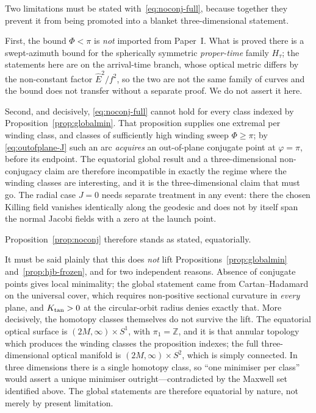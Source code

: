 \documentclass[12pt]{iopart}
\theoremstyle{plain}
\theoremstyle{definition}
\theoremstyle{remark}
\newcommand{\Ehat}{\hat E}
\begin{document}
Two limitations must be stated with~\eqref{eq:noconj-full}, because together they
prevent it from being promoted into a blanket three-dimensional statement.

First, the bound $\Phi<\pi$ is \emph{not} imported from Paper~I. What is proved
there is a swept-azimuth bound for the spherically symmetric \emph{proper-time}
family $H_\tau$; the statements here are on the arrival-time branch, whose optical
metric differs by the non-constant factor $\Ehat^2/f^2$, so the two are not the same
family of curves and the bound does not transfer without a separate proof. We do
not assert it here.

Second, and decisively, \eqref{eq:noconj-full} cannot hold for every class indexed
by Proposition~\ref{prop:globalmin}. That proposition supplies one extremal per
winding class, and classes of sufficiently high winding sweep $\Phi\ge\pi$; by
\eqref{eq:outofplane-J} such an arc \emph{acquires} an out-of-plane conjugate point
at $\varphi=\pi$, before its endpoint. The equatorial global result and a
three-dimensional non-conjugacy claim are therefore incompatible in exactly the
regime where the winding classes are interesting, and it is the three-dimensional
claim that must go. The radial case $J=0$ needs separate treatment in any event:
there the chosen Killing field vanishes identically along the geodesic and does not
by itself span the normal Jacobi fields with a zero at the launch point.

Proposition~\ref{prop:noconj} therefore stands as stated, equatorially.

It must be said plainly that this does \emph{not} lift
Propositions~\ref{prop:globalmin} and~\ref{prop:hjb-frozen}, and for two
independent reasons. Absence of conjugate points gives local minimality; the global
statement came from Cartan--Hadamard on the universal cover, which requires
non-positive sectional curvature in \emph{every} plane, and $K_{\rm tan}>0$ at the
circular-orbit radius denies exactly that. More decisively, the homotopy classes
themselves do not survive the lift. The equatorial optical surface is
$(2M,\infty)\times S^1$, with $\pi_1=\mathbb{Z}$, and it is that annular topology
which produces the winding classes the proposition indexes; the full
three-dimensional optical manifold is $(2M,\infty)\times S^2$, which is simply
connected. In three dimensions there is a single homotopy class, so ``one minimiser
per class'' would assert a unique minimiser outright---contradicted by the Maxwell
set identified above. The global statements are therefore equatorial by nature, not
merely by present limitation.
\end{document}
